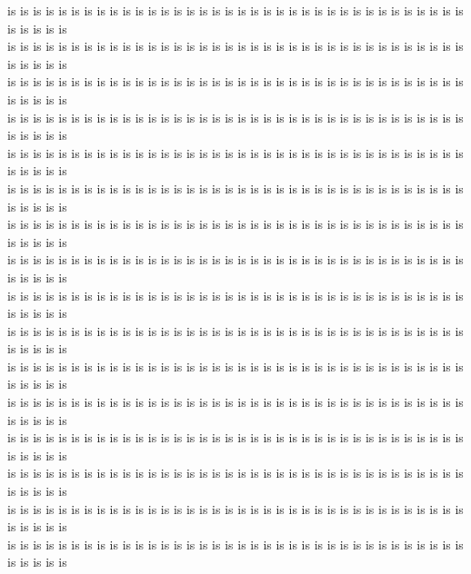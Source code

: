 is is is is is is is is is is is is is is is is is is is is is is is is is is is is is is is is is is is is is is is is is\\
is is is is is is is is is is is is is is is is is is is is is is is is is is is is is is is is is is is is is is is is is\\
is is is is is is is is is is is is is is is is is is is is is is is is is is is is is is is is is is is is is is is is is\\
is is is is is is is is is is is is is is is is is is is is is is is is is is is is is is is is is is is is is is is is is\\
is is is is is is is is is is is is is is is is is is is is is is is is is is is is is is is is is is is is is is is is is\\
is is is is is is is is is is is is is is is is is is is is is is is is is is is is is is is is is is is is is is is is is\\
is is is is is is is is is is is is is is is is is is is is is is is is is is is is is is is is is is is is is is is is is\\
is is is is is is is is is is is is is is is is is is is is is is is is is is is is is is is is is is is is is is is is is\\
is is is is is is is is is is is is is is is is is is is is is is is is is is is is is is is is is is is is is is is is is\\
is is is is is is is is is is is is is is is is is is is is is is is is is is is is is is is is is is is is is is is is is\\
is is is is is is is is is is is is is is is is is is is is is is is is is is is is is is is is is is is is is is is is is\\
is is is is is is is is is is is is is is is is is is is is is is is is is is is is is is is is is is is is is is is is is\\
is is is is is is is is is is is is is is is is is is is is is is is is is is is is is is is is is is is is is is is is is\\
is is is is is is is is is is is is is is is is is is is is is is is is is is is is is is is is is is is is is is is is is\\
is is is is is is is is is is is is is is is is is is is is is is is is is is is is is is is is is is is is is is is is is\\
is is is is is is is is is is is is is is is is is is is is is is is is is is is is is is is is is is is is is is is is is\\
